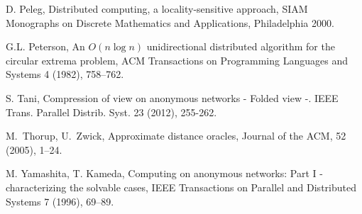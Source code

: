 \documentclass{article}
\begin{document}
\begin{thebibliography}{99}
 D. Peleg,
  Distributed computing, a locality-sensitive approach,
  SIAM Monographs on Discrete Mathematics and Applications, Philadelphia 2000.

G.L. Peterson, An $O(n \log n)$ unidirectional distributed algorithm
for the circular extrema problem,
 ACM Transactions on Programming Languages and Systems 4 (1982), 758--762.
 
 S. Tani,  Compression of view on anonymous networks - Folded view -. IEEE Trans. Parallel Distrib. Syst. 23 (2012), 255-262.


M.~Thorup, U.~Zwick, Approximate distance oracles,
Journal of the ACM, 52 (2005), 1--24.


M. Yamashita, T. Kameda,
Computing on anonymous networks: Part I - characterizing the solvable cases,
IEEE Transactions on Parallel and Distributed Systems 7 (1996), 69--89. 

\end{thebibliography}
\end{document}
